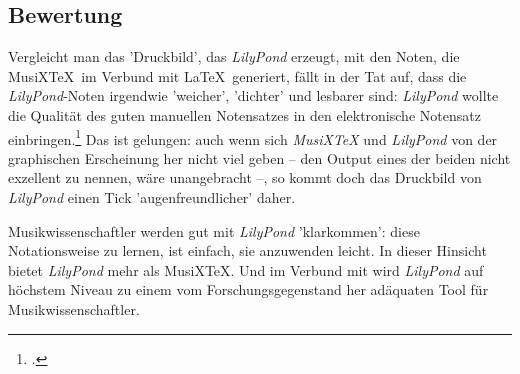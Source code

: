 \subsection{Bewertung}

Vergleicht man das 'Druckbild', das \textit{LilyPond} erzeugt, mit den Noten,
die MusiX\TeX\ im Verbund mit \LaTeX\ generiert, fällt in der Tat auf, dass die
\textit{LilyPond}-Noten irgendwie 'weicher', 'dichter' und lesbarer sind:
\textit{LilyPond} wollte die Qualität des guten manuellen Notensatzes in den
elektronische Notensatz einbringen.\footcite[vgl.][8ff]{LilyPond2018d} Das ist
gelungen: auch wenn sich \textit{MusiX\TeX} und \textit{LilyPond} von der
graphischen Erscheinung her nicht viel geben -- den Output eines der beiden
nicht exzellent zu nennen, wäre unangebracht --, so kommt doch das Druckbild von
\textit{LilyPond} einen Tick 'augenfreundlicher' daher.

Musikwissenschaftler werden gut mit \textit{LilyPond} 'klarkommen': diese
Notationsweise zu lernen, ist einfach, sie anzuwenden leicht. In dieser Hinsicht
bietet \textit{LilyPond} mehr als MusiX\TeX. Und im Verbund mit
 wird \textit{LilyPond} auf höchstem Niveau zu einem vom
Forschungsgegenstand her adäquaten Tool für Musikwissenschaftler.



%
